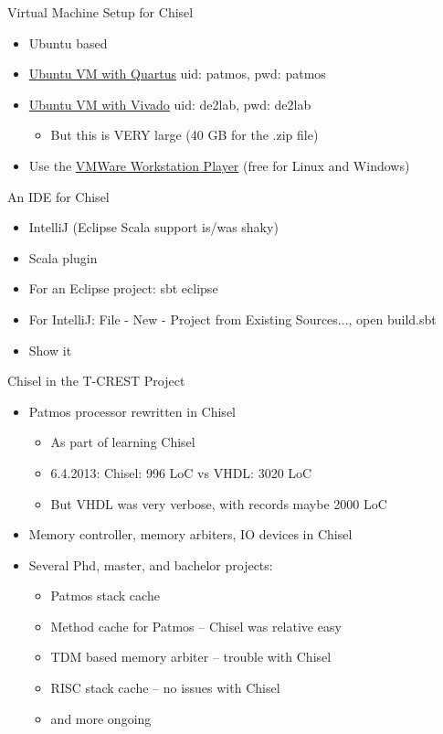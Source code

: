 \begin{frame}[fragile]{Virtual Machine Setup for Chisel}
\begin{itemize}
\item Ubuntu based
\item \href{http://patmos.compute.dtu.dk/patmos-dev.zip}{Ubuntu VM with Quartus} uid: patmos, pwd: patmos
\item \href{https://patmos-download.compute.dtu.dk/de2lab.zip}{Ubuntu VM with Vivado} uid: de2lab, pwd: de2lab
\begin{itemize}
\item But this is VERY large (40 GB for the .zip file)
\end{itemize}
\item Use the  \href{https://www.vmware.com/products/workstation-player.html} {VMWare Workstation Player} (free for Linux and Windows)
\end{itemize}
\end{frame}


\begin{frame}[fragile]{An IDE for Chisel}
\begin{itemize}
\item IntelliJ (Eclipse Scala support is/was shaky)
\item Scala plugin
\item For an Eclipse project: sbt eclipse
\item For IntelliJ: File - New - Project from Existing Sources..., open build.sbt
\item Show it
\end{itemize}
\end{frame}

\begin{frame}[fragile]{Chisel in the T-CREST Project}
\begin{itemize}
\item Patmos processor rewritten in Chisel
\begin{itemize}
\item As part of learning Chisel
\item 6.4.2013: Chisel: 996 LoC vs VHDL: 3020 LoC
\item But VHDL was very verbose, with records maybe 2000 LoC
\end{itemize}
\item Memory controller, memory arbiters, IO devices in Chisel
\item Several Phd, master, and bachelor projects:
\begin{itemize}
\item Patmos stack cache
\item Method cache for Patmos -- Chisel was relative easy
\item TDM based memory arbiter -- trouble with Chisel
\item RISC stack cache -- no issues with Chisel
\item and more ongoing 
\end{itemize}
\end{itemize}
\end{frame}

